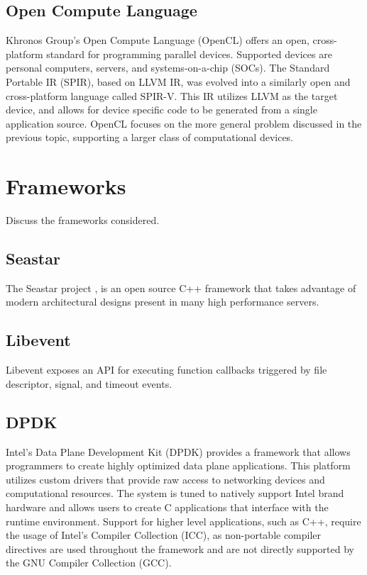 \subsection{Open Compute Language}
\label{related:hcp:ocl}
Khronos Group's Open Compute Language (OpenCL) \cite{opencl} offers an open, 
cross-platform standard for programming parallel devices. Supported devices are
personal computers, servers, and systems-on-a-chip (SOCs). The Standard
Portable IR (SPIR), based on LLVM IR, was evolved into a similarly open and 
cross-platform language called SPIR-V. This IR utilizes LLVM as the target
device, and allows for device specific code to be generated from a single
application source. OpenCL focuses on the more general problem discussed in
the previous topic, supporting a larger class of computational devices.

\section{Frameworks}
\label{related:frameworks}
Discuss the frameworks considered.

\subsection{Seastar}
\label{related:frameworks:seastar}
The Seastar project \cite{seastar}, is an open source C++ framework that
takes advantage of modern architectural designs present in many high 
performance servers.

\subsection{Libevent}
\label{related:frameworks:libevent}
Libevent \cite{libevent} exposes an API for executing function callbacks
triggered by file descriptor, signal, and timeout events.

\subsection{DPDK}
\label{related:frameworks:dpdk}
Intel's Data Plane Development Kit (DPDK) \cite{dpdk} provides a framework that
allows programmers to create highly optimized data plane applications. This
platform utilizes custom drivers that provide raw access to networking devices
and computational resources. The system is tuned to natively support Intel
brand hardware and allows users to create C applications that interface with
the runtime environment. Support for higher level applications, such as C++,
require the usage of Intel's Compiler Collection (ICC), as non-portable 
compiler directives are used throughout the framework and are not directly
supported by the GNU Compiler Collection (GCC).

